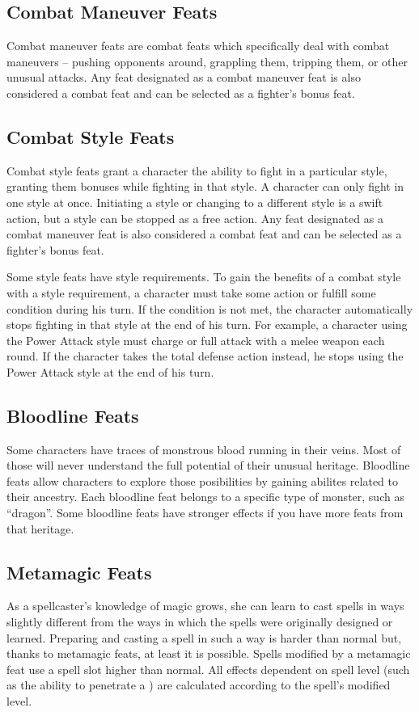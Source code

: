\subsection{Combat Maneuver Feats}
Combat maneuver feats are combat feats which specifically deal with combat maneuvers -- pushing opponents around, grappling them, tripping them, or other unusual attacks. Any feat designated as a combat maneuver feat is also considered a combat feat and can be selected as a fighter's bonus feat.

\subsection{Combat Style Feats}
Combat style feats grant a character the ability to fight in a particular style, granting them bonuses while fighting in that style. A character can only fight in one style at once. Initiating a style or changing to a different style is a swift action, but a style can be stopped as a free action. Any feat designated as a combat maneuver feat is also considered a combat feat and can be selected as a fighter's bonus feat.

Some style feats have style requirements. To gain the benefits of a combat style with a style requirement, a character must take some action or fulfill some condition during his turn. If the condition is not met, the character automatically stops fighting in that style at the end of his turn. For example, a character using the Power Attack style must charge or full attack with a melee weapon each round. If the character takes the total defense action instead, he stops using the Power Attack style at the end of his turn.

\subsection{Bloodline Feats}

Some characters have traces of monstrous blood running in their veins. Most of those will never understand the full potential of their unusual heritage. Bloodline feats allow characters to explore those posibilities by gaining abilites related to their ancestry. Each bloodline feat belongs to a specific type of monster, such as ``dragon''. Some bloodline feats have stronger effects if you have more feats from that heritage.

\subsection{Metamagic Feats}
As a spellcaster's knowledge of magic grows, she can learn to cast spells in ways slightly different from the ways in which the spells were originally designed or learned. Preparing and casting a spell in such a way is harder than normal but, thanks to metamagic feats, at least it is possible. Spells modified by a metamagic feat use a spell slot higher than normal. All effects dependent on spell level (such as the ability to penetrate a ) are calculated according to the spell's modified level.


